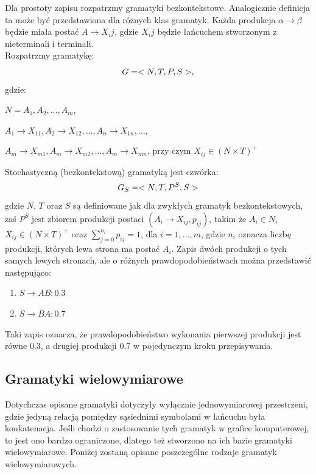 Dla prostoty zapisu rozpatrzmy gramatyki bezkontekstowe. Analogicznie definicja
ta może być przedstawiona dla różnych klas gramatyk. Każda produkcja
$\alpha\longrightarrow\beta$ będzie miała postać $A\longrightarrow X_ij$, gdzie
$X_ij$ będzie łańcuchem stworzonym z nieterminali i terminali.
\\
Rozpatrzmy gramatykę:
\begin{equation}
G=<N,T,P,S>,
\vspace{-10pt}
\end{equation}
gdzie:
\begin{description}
\item $N={A_1, A_2, \ldots, A_m}$,
\item $A_1\longrightarrow X_{11}, A_2\longrightarrow X_{12}, \ldots,
A_n\longrightarrow X_{1n}, \ldots,$
\item $A_m\longrightarrow X_{m1}, A_m\longrightarrow X_{m2}, \ldots,
A_m\longrightarrow X_{mn}$, przy czym $X_{ij}\in (N\times T)^+$
\end{description}
Stochastyczną (bezkontekstową) gramatyką jest czwórka:
\begin{equation}
G_S=<N,T,P^S,S>
\vspace{-10pt}
\end{equation}
gdzie $N$, $T$ oraz $S$ są definiowane jak dla zwykłych gramatyk
bezkontekstowych, zaś $P^S$ jest zbiorem produkcji postaci
$(A_i\longrightarrow X_{ij},p_{ij})$, takim że $A_i\in N$, $X_{ij}\in (N\times
T)^+$ oraz $\displaystyle\sum_{j=0}^{n_i}p_{ij}=1$, dla $i=1,\ldots,m$, gdzie
$n_i$ oznacza liczbę produkcji, których lewa strona ma postać $A_i$.
Zapis dwóch produkcji o tych samych lewych stronach, ale o różnych
prawdopodobieństwach można przedstawić następująco:
\begin{enumerate}
  \item $S\longrightarrow AB : 0.3$
  \item $S\longrightarrow BA : 0.7$
\end{enumerate}
Taki zapis oznacza, że prawdopodobieństwo wykonania pierwszej produkcji jest
równe $0.3$, a drugiej produkcji $0.7$ w pojedynczym kroku przepisywania.
\subsection{Gramatyki wielowymiarowe}
Dotychczas opisane gramatyki dotyczyły wyłącznie jednowymiarowej przestrzeni,
gdzie jedyną relacją pomiędzy sąsiednimi symbolami w łańcuchu była konkatenacja.
Jeśli chodzi o zastosowanie tych gramatyk w grafice komputerowej, to jest ono
bardzo ograniczone, dlatego też stworzono na ich bazie gramatyki wielowymiarowe.
Poniżej zostaną opisane poszczególne rodzaje gramatyk wielowymiarowych.
